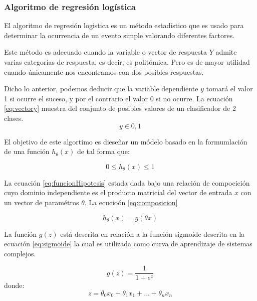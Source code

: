 \subsubsection{Algoritmo de regresi\'on log\'istica}

El algoritmo de regresi\'on logistica es un m\'etodo estad\'istico que es usado para determinar la ocurrencia de un evento simple valorando diferentes factores.  

Este m\'etodo es adecuado cuando la variable o vector de respuesta $Y$ admite varias categor\'ias de respuesta, es decir, es polit\'omica. Pero es de mayor utilidad cuando \'unicamente nos encontramos con dos posibles respuestas.

Dicho lo anterior, podemos deducir que la variable dependiente $y$ tomar\'a el valor 1 si ocurre el suceso, y por el contrario el valor 0 si no ocurre. La ecuaci\'on \ref{eq:vectory} muestra del conjunto de posibles valores de un clasificador de 2 clases.
\begin{equation}\label{eq:vectory}
y \in {0,1}
\end{equation}

El objetivo de este algortimo es diese\~nar un m\'odelo basado en la formumlaci\'on de una funci\'on $h_{\theta}(x)$ de tal forma que:

\begin{equation}\label{eq:funcionHipotesis}
0 \leq h_{\theta}(x) \leq 1
\end{equation}

La ecuaci\'on \ref{eq:funcionHipotesis} estada dada bajo una relaci\'on de compocici\'on cuyo dominio independiente es el producto matricial del vector de entrada $x$ con un vector de param\'etros $\theta$. La ecucio\'on \ref{eq:composicion}

\begin{equation}\label{eq:composicion}
h_{\theta}(x) = g(\theta x)
\end{equation}

La funci\'on $g(z)$ est\'a descrita en relaci\'on a la funci\'on sigmoide descrita en la ecuaci\'on \ref{eq:sigmoide} la cual es utilizada como curva de aprendizaje de sistemas complejos.


\begin{equation}\label{eq:sigmoide}
g(z) = \frac{1}{1+e^z}
\end{equation}
donde:
\begin{equation}
z = \theta_{0}x_{0}+ \theta_{1}x_{1} + ... +  \theta_{n}x_{n}
\end{equation}

